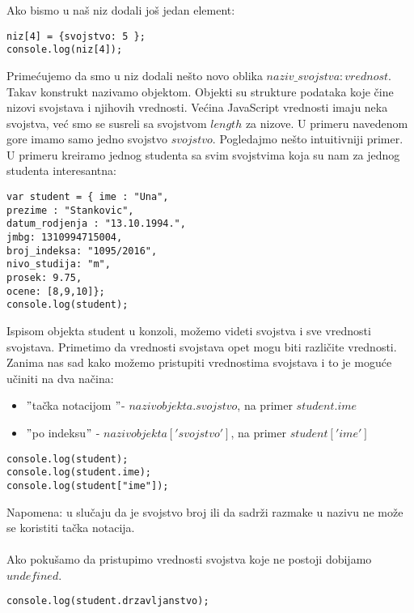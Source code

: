 Ako bismo u naš niz dodali još jedan element:
\begin{lstlisting}[backgroundcolor = \color{lightgray}, breaklines=true]
niz[4] = {svojstvo: 5 };
console.log(niz[4]);			
\end{lstlisting}
Primećujemo da smo u niz dodali nešto novo oblika ${naziv\_svojstva : vrednost }$. Takav konstrukt nazivamo objektom. Objekti su strukture podataka koje čine nizovi svojstava i njihovih vrednosti. Većina JavaScript vrednosti imaju neka svojstva, već smo se susreli sa svojstvom $length$ za nizove. U primeru navedenom gore imamo samo jedno svojstvo $svojstvo$. Pogledajmo nešto intuitivniji primer. U primeru kreiramo jednog studenta sa svim svojstvima koja su nam za jednog studenta interesantna:
\begin{lstlisting}[backgroundcolor = \color{lightgray}, breaklines=true]
var student = { ime : "Una",
prezime : "Stankovic",
datum_rodjenja : "13.10.1994.",
jmbg: 1310994715004,
broj_indeksa: "1095/2016",
nivo_studija: "m",
prosek: 9.75,
ocene: [8,9,10]};
console.log(student);
\end{lstlisting}
Ispisom objekta student u konzoli, možemo videti svojstva i sve vrednosti svojstava. Primetimo da vrednosti svojstava opet mogu biti različite vrednosti.\\
Zanima nas sad kako možemo pristupiti vrednostima svojstava i to je moguće učiniti na dva načina:
\begin{itemize}
	\item $"$tačka notacijom $"$- $nazivobjekta.svojstvo$, na primer $student.ime$
	\item $"$po indeksu$"$ - $nazivobjekta['svojstvo']$, na primer $student['ime']$
\end{itemize}
\begin{lstlisting}[backgroundcolor = \color{lightgray}, breaklines=true]
console.log(student);
console.log(student.ime);
console.log(student["ime"]);
\end{lstlisting}
Napomena: u slučaju da je svojstvo broj ili da sadrži razmake u nazivu ne može se koristiti tačka notacija.\\\\
Ako pokušamo da pristupimo vrednosti svojstva koje ne postoji dobijamo $undefined$.
\begin{lstlisting}[backgroundcolor = \color{lightgray}, breaklines=true]
console.log(student.drzavljanstvo);
\end{lstlisting}

